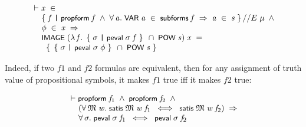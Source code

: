 \documentclass[letterpaper]{article}
\renewcommand{\HOLConst}[1]{{\textsf{\upshape\small #1}}}
\newenvironment{holmath}{\begin{displaymath}\begin{array}{l}}{\end{array}\end{displaymath}\ignorespacesafterend}
\begin{document}
\begin{holmath}
  \ensuremath{\HOLTokenTurnstile}\HOLFreeVar{x}\;\HOLSymConst{\HOLTokenIn{}}\\
\;\;\;\;\;\HOLTokenLeftbrace{}\HOLBoundVar{f}\;\HOLTokenBar{}\;\HOLConst{propform}\;\HOLBoundVar{f}\;\HOLSymConst{\HOLTokenConj{}}\;\HOLSymConst{\HOLTokenForall{}}\HOLBoundVar{a}.\;\HOLConst{VAR}\;\HOLBoundVar{a}\;\HOLSymConst{\HOLTokenIn{}}\;\HOLConst{subforms}\;\HOLBoundVar{f}\;\HOLSymConst{\HOLTokenImp{}}\;\HOLBoundVar{a}\;\HOLSymConst{\HOLTokenIn{}}\;\HOLFreeVar{s}\HOLTokenRightbrace{}\HOLSymConst{//E}\;\HOLFreeVar{\ensuremath{\mu}}\;\HOLSymConst{\HOLTokenConj{}}\\
\;\;\;\;\;\HOLFreeVar{\ensuremath{\phi}}\;\HOLSymConst{\HOLTokenIn{}}\;\HOLFreeVar{x}\;\HOLSymConst{\HOLTokenImp{}}\\
\;\;\;\;\;\HOLConst{IMAGE}\;(\HOLTokenLambda{}\HOLBoundVar{f}.\;\HOLTokenLeftbrace{}\HOLBoundVar{\ensuremath{\sigma}}\;\HOLTokenBar{}\;\HOLConst{peval}\;\HOLBoundVar{\ensuremath{\sigma}}\;\HOLBoundVar{f}\HOLTokenRightbrace{}\;\HOLSymConst{\HOLTokenInter{}}\;\HOLConst{POW}\;\HOLFreeVar{s})\;\HOLFreeVar{x}\;\HOLSymConst{=}\\
\;\;\;\;\;\;\;\HOLTokenLeftbrace{}\HOLTokenLeftbrace{}\HOLBoundVar{\ensuremath{\sigma}}\;\HOLTokenBar{}\;\HOLConst{peval}\;\HOLBoundVar{\ensuremath{\sigma}}\;\HOLFreeVar{\ensuremath{\phi}}\HOLTokenRightbrace{}\;\HOLSymConst{\HOLTokenInter{}}\;\HOLConst{POW}\;\HOLFreeVar{s}\HOLTokenRightbrace{}
\end{holmath}

Indeed, if two $f1$ and $f2$ formulas are equivalent, then for any assignment of truth value of propositional symbols, it makes $f1$ true iff it makes $f2$ true:

\begin{holmath}
  \ensuremath{\HOLTokenTurnstile}\HOLConst{propform}\;\HOLFreeVar{f\sb{\mathrm{1}}}\;\HOLSymConst{\HOLTokenConj{}}\;\HOLConst{propform}\;\HOLFreeVar{f\sb{\mathrm{2}}}\;\HOLSymConst{\HOLTokenConj{}}\\
\;\;\;\;\;(\HOLSymConst{\HOLTokenForall{}}\HOLBoundVar{\ensuremath{\mathfrak{M}}}\;\HOLBoundVar{w}.\;\HOLConst{satis}\;\HOLBoundVar{\ensuremath{\mathfrak{M}}}\;\HOLBoundVar{w}\;\HOLFreeVar{f\sb{\mathrm{1}}}\;\HOLSymConst{\HOLTokenEquiv{}}\;\HOLConst{satis}\;\HOLBoundVar{\ensuremath{\mathfrak{M}}}\;\HOLBoundVar{w}\;\HOLFreeVar{f\sb{\mathrm{2}}})\;\HOLSymConst{\HOLTokenImp{}}\\
\;\;\;\;\;\HOLSymConst{\HOLTokenForall{}}\HOLBoundVar{\ensuremath{\sigma}}.\;\HOLConst{peval}\;\HOLBoundVar{\ensuremath{\sigma}}\;\HOLFreeVar{f\sb{\mathrm{1}}}\;\HOLSymConst{\HOLTokenEquiv{}}\;\HOLConst{peval}\;\HOLBoundVar{\ensuremath{\sigma}}\;\HOLFreeVar{f\sb{\mathrm{2}}}
\end{holmath}
\end{document}
